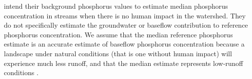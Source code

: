 	\citet{robertson_wadeable_2006} intend their background phosphorus values to estimate median phosphorus concentration in streams when there is no human impact in the watershed. They do not specifically estimate the groundwater or baseflow contribution to reference phosphorus concentration. We assume that the median reference phosphorus estimate is an accurate estimate of baseflow phosphorus concentration because a landscape under natural conditions (that is one without human impact) will experience much less runoff, and that the median estimate represents low-runoff conditions .
	
	
	
	